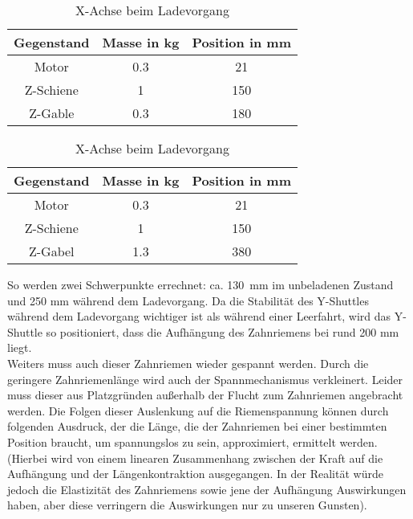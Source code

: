 \begin{table}[H]
    \centering
    \centering
        \begin{tabular}{c c c}
            Gegenstand & Masse in kg & Position in mm\\
            \hline
            Motor & 0.3 & 21 \\
            Z-Schiene & 1 & 150 \\
            Z-Gable & 0.3 & 180 
        \end{tabular}
    \caption{X-Achse unbeladen und eingefahren}
        \vspace{5mm}
        \centering
        \begin{tabular}{c c c}
            Gegenstand & Masse in kg & Position in mm\\ 
            \hline
            Motor & 0.3 & 21 \\
            Z-Schiene & 1 & 150 \\
            Z-Gabel & 1.3 & 380
        \end{tabular}
        \caption{X-Achse beim Ladevorgang}
\end{table}
So werden zwei Schwerpunkte errechnet: ca. \SI{130}{\mm} im unbeladenen Zustand und 250 mm während dem Ladevorgang. Da die Stabilität des Y-Shuttles während dem Ladevorgang wichtiger ist als während einer Leerfahrt, wird das Y-Shuttle so positioniert, dass die Aufhängung des Zahnriemens bei rund 200 mm liegt.\\
Weiters muss auch dieser Zahnriemen wieder gespannt werden. Durch die geringere Zahnriemenlänge wird auch der Spannmechanismus verkleinert.
Leider muss dieser aus Platzgründen außerhalb der Flucht zum Zahnriemen angebracht werden. Die Folgen dieser Auslenkung auf die Riemenspannung können durch folgenden Ausdruck, der die Länge, die der Zahnriemen bei einer bestimmten Position braucht, um spannungslos zu sein, approximiert, ermittelt werden. (Hierbei wird von einem linearen Zusammenhang zwischen der Kraft auf die Aufhängung und der Längenkontraktion ausgegangen. In der Realität würde jedoch die Elastizität des Zahnriemens sowie jene der Aufhängung Auswirkungen haben, aber diese verringern die Auswirkungen nur zu unseren Gunsten).
\\

